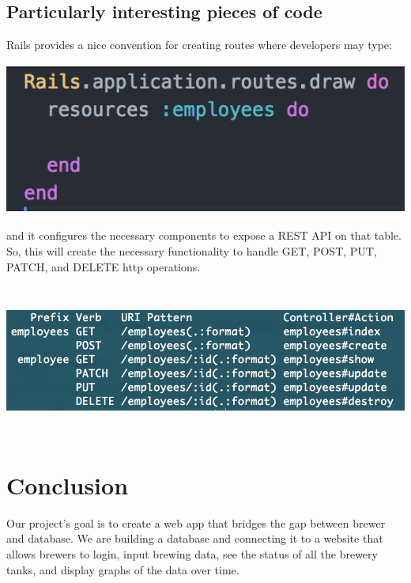 \documentclass[draftclsnofoot,onecolumn,letterpaper,10pt,compsoc]{IEEEtran}
\begin{document}
\subsection{Particularly interesting pieces of code}
Rails provides a nice convention for creating routes where developers may type:

\centerline{\includegraphics[height=5cm]{screenshots/routesrb.png}}

and it configures the necessary components to expose a REST API on that table.
So, this will create the necessary functionality to handle GET, POST, PUT, PATCH, and DELETE http operations.

\centerline{\includegraphics[height=5cm]{screenshots/showroutes.png}}

\section{Conclusion}
Our project's goal is to create a web app that bridges the gap between brewer and database.
We are building a database and connecting it to a website that allows brewers to login, input brewing data, see the status of all the brewery tanks, and display graphs of the data over time.
\end{document}

